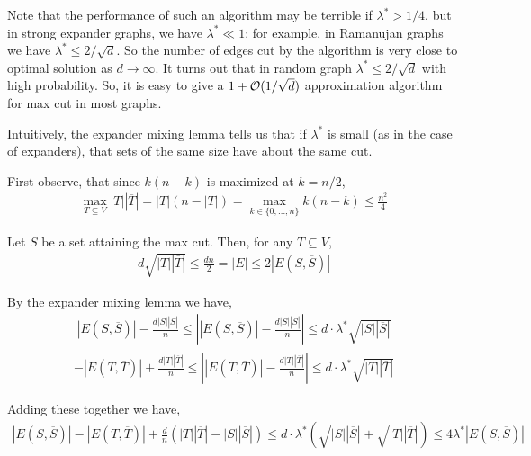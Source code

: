 \documentclass[10pt]{article}
\begin{document}
\begin{problem}[Problem 2]
    Note that the performance of such an algorithm may be terrible if \( \lambda^* > 1/4 \), but in strong expander graphs, we have \( \lambda^* \ll 1 \); for example, in Ramanujan graphs we have \( \lambda^*\leq 2/\sqrt{d} \). So the number of edges cut by the algorithm is very close to optimal solution as \( d\to\infty \). It turns out that in random graph \( \lambda^* \leq 2/\sqrt{d} \) with high probability. So, it is easy to give a \( 1 + \mathcal{O}(1/\sqrt{d}) \) approximation algorithm for max cut in most graphs.
\end{problem}

\begin{solution}[Solution]
Intuitively, the expander mixing lemma tells us that if \( \lambda^* \) is small (as in the case of expanders), that sets of the same size have about the same cut. 

First observe, that since \( k(n-k) \) is maximized at \( k=n/2 \),
\begin{align*}
    \max_{T\subseteq V} |T||\overline{T}| = |T|(n-|T|) = \max_{k\in\{0,\ldots,n\}} k(n-k) \leq \frac{n^2}{4}
\end{align*}


Let \( S \) be a set attaining the max cut. Then, for any \( T\subseteq V \),
\begin{align*}
    d \sqrt{|T| |\overline{T}|} \leq \frac{dn}{2} = |E| \leq 2|E(S,\overline{S})|
\end{align*}

By the expander mixing lemma we have,
\begin{align*}
    |E(S,\overline{S})| - \frac{d|S||\overline{S}|}{n}
    \leq \left| |E(S,\overline{S})| - \frac{d|S||\overline{S}|}{n} \right|
    \leq d \cdot \lambda^* \sqrt{|S||\overline{S}|}
\end{align*}
\begin{align*}
    - |E(T,\overline{T})| + \frac{d|T||\overline{T}|}{n}
    \leq \left| |E(T,\overline{T})| - \frac{d|T||\overline{T}|}{n}  \right|
    \leq d\cdot \lambda^* \sqrt{|T||\overline{T}|}
\end{align*}

Adding these together we have,
\begin{align*}
    |E(S,\overline{S})| - |E(T,\overline{T})| + \frac{d}{n} \left( |T||\overline{T}| - |S||\overline{S}| \right)  
    \leq d \cdot \lambda^* \left(\sqrt{|S||\overline{S}|} + \sqrt{|T||\overline{T}|}\right)
    \leq 4 \lambda^* |E(S,\overline{S})|
\end{align*}


\end{solution}
\end{document}
